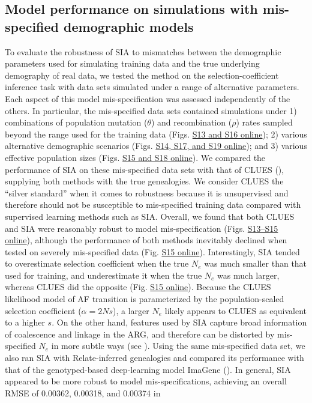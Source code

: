 \subsection{Model performance on simulations with mis-specified demographic models}
To evaluate the robustness of \ac{SIA} to mismatches between the demographic parameters used for simulating training data and the true underlying demography of real data, we tested the method on the selection-coefficient inference task with data sets simulated under a range of alternative parameters. Each aspect of this model mis-specification was assessed independently of the others. In particular, the mis-specified data sets contained simulations under 1) combinations of population mutation ($\theta$) and recombination ($\rho$) rates sampled beyond the range used for the training data (Figs. \href{https://academic.oup.com/mbe/article/39/1/msab332/6433161?login=true#supplementary-data}{S13 and S16 online}); 2) various alternative demographic scenarios (Figs. \href{https://academic.oup.com/mbe/article/39/1/msab332/6433161?login=true#supplementary-data}{S14, S17, and S19 online}); and 3) various effective population sizes (Figs. \href{https://academic.oup.com/mbe/article/39/1/msab332/6433161?login=true#supplementary-data}{S15 and S18 online}). We compared the performance of \ac{SIA} on these mis-specified data sets with that of CLUES (\cite{stern_approximate_2019}), supplying both methods with the true genealogies. We consider CLUES the “silver standard” when it comes to robustness because it is unsupervised and therefore should not be susceptible to mis-specified training data compared with supervised learning methods such as \ac{SIA}. Overall, we found that both CLUES and \ac{SIA} were reasonably robust to model mis-specification (Figs. \href{https://academic.oup.com/mbe/article/39/1/msab332/6433161?login=true#supplementary-data}{S13–S15 online}), although the performance of both methods inevitably declined when tested on severely mis-specified data (Fig. \href{https://academic.oup.com/mbe/article/39/1/msab332/6433161?login=true#supplementary-data}{S15 online}). Interestingly, \ac{SIA} tended to overestimate selection coefficient when the true $N_e$ was much smaller than that used for training, and underestimate it when the true $N_e$ was much larger, whereas CLUES did the opposite (Fig. \href{https://academic.oup.com/mbe/article/39/1/msab332/6433161?login=true#supplementary-data}{S15 online}). Because the CLUES likelihood model of \ac{AF} transition is parameterized by the population-scaled selection coefficient ($\alpha = 2Ns$), a larger $N_e$ likely appears to CLUES as equivalent to a higher $s$. On the other hand, features used by \ac{SIA} capture broad information of coalescence and linkage in the \ac{ARG}, and therefore can be distorted by mis-specified $N_e$ in more subtle ways (see ). Using the same mis-specified data set, we also ran \ac{SIA} with Relate-inferred genealogies and compared its performance with that of the genotyped-based deep-learning model ImaGene (\cite{flagel_unreasonable_2019,torada_imagene_2019}). In general, \ac{SIA} appeared to be more robust to model mis-specifications, achieving an overall \ac{RMSE} of 0.00362, 0.00318, and 0.00374 in 